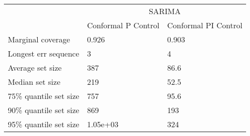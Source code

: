 \begin{tabular}{lll}
\toprule
& \multicolumn{2}{c}{SARIMA} \\
& Conformal P Control & Conformal PI Control \\
\midrule
Marginal coverage & 0.926 & 0.903 \\
Longest err sequence & 3 & 4 \\
Average set size & 387 & 86.6 \\
Median set size & 219 & 52.5 \\
75\% quantile set size & 757 & 95.6 \\
90\% quantile set size & 869 & 193 \\
95\% quantile set size & 1.05e+03 & 324 \\
\bottomrule
\end{tabular}
